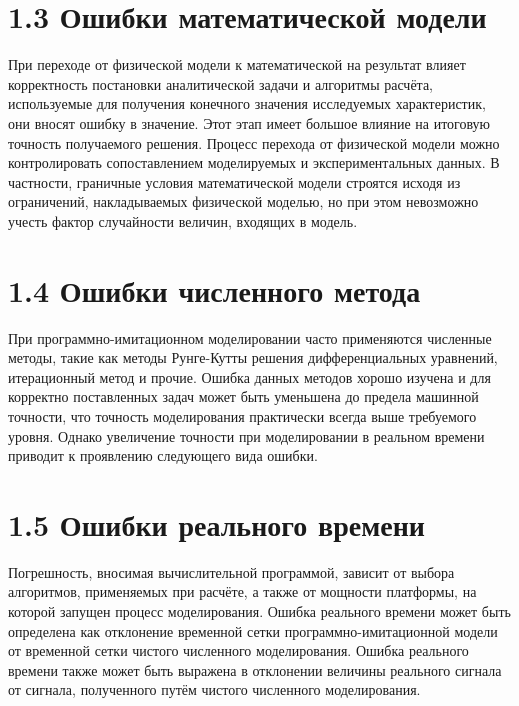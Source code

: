 {\begin{onehalfspace}
    \section*{\large{1.3 Ошибки математической модели }}
    При переходе от физической модели к математической на результат влияет корректность постановки аналитической задачи и алгоритмы расчёта, используемые для получения конечного значения исследуемых характеристик, они вносят ошибку в значение. Этот этап имеет большое влияние на итоговую точность получаемого решения. Процесс перехода от физической модели можно контролировать сопоставлением моделируемых и экспериментальных данных. В частности, граничные условия математической модели строятся исходя из ограничений, накладываемых физической моделью, но при этом невозможно учесть фактор случайности величин, входящих в модель.
 


    \section*{\large{1.4	Ошибки численного метода}}
   При программно-имитационном моделировании часто применяются численные методы, такие как методы Рунге-Кутты решения дифференциальных уравнений, итерационный метод и прочие. Ошибка данных методов хорошо изучена и для корректно поставленных задач может быть уменьшена до предела машинной точности, что точность моделирования практически всегда выше требуемого уровня. Однако увеличение точности при моделировании в реальном времени приводит к проявлению следующего вида ошибки.

    \section*{\large{1.5 Ошибки реального времени}}
   Погрешность, вносимая вычислительной программой, зависит от выбора алгоритмов, применяемых при расчёте, а также от мощности платформы, на которой запущен процесс моделирования. 
Ошибка реального времени может быть определена как отклонение временной сетки программно-имитационной модели от временной сетки чистого численного моделирования.
Ошибка реального времени также может быть выражена в отклонении величины реального сигнала от сигнала, полученного путём чистого численного моделирования.





\end{onehalfspace}}
